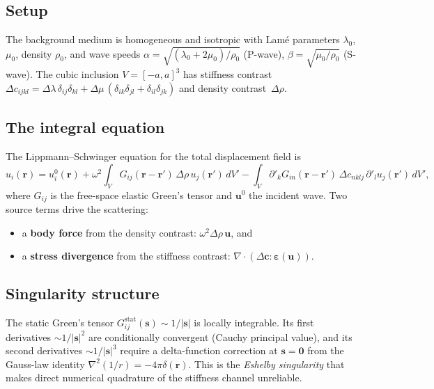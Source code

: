 \documentclass[11pt,a4paper]{article}
\newcommand{\D}{\Delta}
\newcommand{\bs}{\bm{s}}
\newcommand{\br}{\bm{r}}
\newcommand{\be}{\bm{\varepsilon}}
\newcommand{\bu}{\bm{u}}
\theoremstyle{plain}
\theoremstyle{definition}
\theoremstyle{remark}
\begin{document}
\subsection{Setup}

The background medium is homogeneous and isotropic with Lam\'e
parameters $\lambda_0$, $\mu_0$, density $\rho_0$, and wave speeds
$\alpha = \sqrt{(\lambda_0 + 2\mu_0)/\rho_0}$ (P-wave),
$\beta = \sqrt{\mu_0/\rho_0}$ (S-wave).  The cubic inclusion
$V = [-a,a]^3$ has stiffness contrast
$\D c_{ijkl} = \D\lambda\,\delta_{ij}\delta_{kl}
+ \D\mu\,(\delta_{ik}\delta_{jl} + \delta_{il}\delta_{jk})$
and density contrast~$\D\rho$.

\subsection{The integral equation}

The Lippmann--Schwinger equation for the total displacement field is
\begin{equation}
  u_i(\br) = u_i^{0}(\br)
   + \omega^2 \!\int_V G_{ij}(\br - \br')\,\D\rho\, u_j(\br')\,dV'
   - \!\int_V \partial'_k G_{in}(\br - \br')\,\D c_{nklj}\,
   \partial'_l u_j(\br')\,dV',
   \label{eq:LS}
\end{equation}
where $G_{ij}$ is the free-space elastic Green's tensor and $\bu^0$
the incident wave.  Two source terms drive the scattering:
\begin{itemize}[nosep]
  \item a \textbf{body force} from the density contrast:
    $\omega^2\D\rho\,\bu$, and
  \item a \textbf{stress divergence} from the stiffness contrast:
    $\nabla\cdot(\D\mathbf{c}:\be(\bu))$.
\end{itemize}

\subsection{Singularity structure}

The static Green's tensor $G^{\mathrm{stat}}_{ij}(\bs) \sim 1/|\bs|$
is locally integrable.  Its first derivatives $\sim 1/|\bs|^2$ are
conditionally convergent (Cauchy principal value), and its second
derivatives $\sim 1/|\bs|^3$ require a delta-function correction at
$\bs = \mathbf{0}$ from the Gauss-law identity
$\nabla^2(1/r) = -4\pi\delta(\br)$.  This is the
\emph{Eshelby singularity} that makes direct numerical quadrature
of the stiffness channel unreliable.
\end{document}

